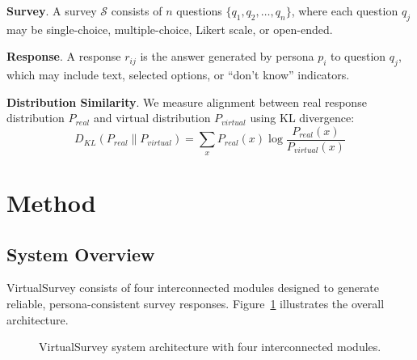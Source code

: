 \documentclass[sigconf,nonarchival]{acmart}
\begin{document}
\textbf{Survey}. A survey $\mathcal{S}$ consists of $n$ questions $\{q_1, q_2, \ldots, q_n\}$, where each question $q_j$ may be single-choice, multiple-choice, Likert scale, or open-ended.

\textbf{Response}. A response $r_{ij}$ is the answer generated by persona $p_i$ to question $q_j$, which may include text, selected options, or ``don't know'' indicators.

\textbf{Distribution Similarity}. We measure alignment between real response distribution $P_{real}$ and virtual distribution $P_{virtual}$ using KL divergence:
\begin{equation}
D_{KL}(P_{real} \| P_{virtual}) = \sum_x P_{real}(x) \log \frac{P_{real}(x)}{P_{virtual}(x)}
\end{equation}


\section{Method}

\subsection{System Overview}

VirtualSurvey consists of four interconnected modules designed to generate reliable, persona-consistent survey responses. Figure~\ref{fig:system} illustrates the overall architecture.

\begin{figure}[t]
\centering
{}
\caption{VirtualSurvey system architecture with four interconnected modules.}
\label{fig:system}
\end{figure}
\end{document}
